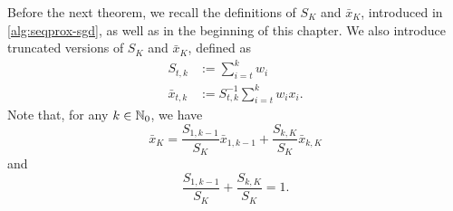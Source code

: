 Before the next theorem, we recall the definitions of $S_K$ and $\bar{x}_K$, introduced in \cref{alg:seqprox-sgd}, as
well as in the beginning of this chapter. We also introduce truncated versions of $S_K$ and $\bar{x}_K$, defined as
\begin{align*}
        S_{t,k} &:= \sum_{i=t}^k w_i    \\
        \bar{x}_{t, k} &:= S_{t,k}^{-1} \sum_{i=t}^k w_i x_i.
\end{align*}
Note that, for any $k\in\mathbb{N}_0$, we have
\begin{equation}
    \label{eq:subsec:convergence-rates-in-expectation:truncated-averaged-iterates}
    \bar{x}_K = \frac{S_{1, k-1}}{S_K} \bar{x}_{1, k-1} + \frac{S_{k, K}}{S_K} \bar{x}_{k, K}    
\end{equation}
and
\begin{equation}
    \label{eq:subsec:convergence-rates-in-expectation:truncated-sums}
    \frac{S_{1, k-1}}{S_K} + \frac{S_{k, K}}{S_K} = 1.    
\end{equation}

